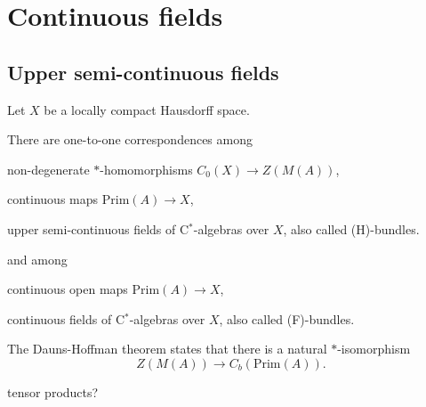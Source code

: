 \documentclass{../../large}
\begin{document}
\chapter{Continuous fields}


\section{Upper semi-continuous fields}

\begin{prb}
Let $X$ be a locally compact Hausdorff space.


There are one-to-one correspondences among
\begin{parts}
\item non-degenerate $*$-homomorphisms $C_0(X)\to Z(M(A))$,
\item continuous maps $\mathrm{Prim}(A)\to X$,
\item upper semi-continuous fields of C$^*$-algebras over $X$, also called (H)-bundles.
\end{parts}
and among
\begin{parts}
\item continuous open maps $\mathrm{Prim}(A)\to X$,
\item continuous fields of C$^*$-algebras over $X$, also called (F)-bundles.
\end{parts}

The Dauns-Hoffman theorem states that there is a natural $*$-isomorphism
\[Z(M(A))\to C_b(\mathrm{Prim}(A)).\]

tensor products?
\end{prb}
\end{document}
